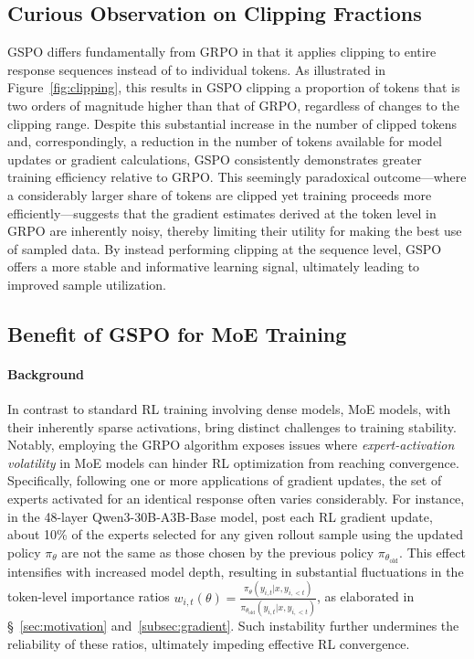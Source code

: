 \subsection{Curious Observation on Clipping Fractions}

GSPO differs fundamentally from GRPO in that it applies clipping to entire response sequences instead of to individual tokens. As illustrated in Figure~\ref{fig:clipping}, this results in GSPO clipping a proportion of tokens that is two orders of magnitude higher than that of GRPO, regardless of changes to the clipping range. Despite this substantial increase in the number of clipped tokens and, correspondingly, a reduction in the number of tokens available for model updates or gradient calculations, GSPO consistently demonstrates greater training efficiency relative to GRPO. This seemingly paradoxical outcome—where a considerably larger share of tokens are clipped yet training proceeds more efficiently—suggests that the gradient estimates derived at the token level in GRPO are inherently noisy, thereby limiting their utility for making the best use of sampled data. By instead performing clipping at the sequence level, GSPO offers a more stable and informative learning signal, ultimately leading to improved sample utilization.

\subsection{Benefit of GSPO for MoE Training}
\label{subsec:routing_replay}

\paragraph{Background}
In contrast to standard RL training involving dense models, MoE models, with their inherently sparse activations, bring distinct challenges to training stability. Notably, employing the GRPO algorithm exposes issues where \textit{expert-activation volatility} in MoE models can hinder RL optimization from reaching convergence. Specifically, following one or more applications of gradient updates, the set of experts activated for an identical response often varies considerably. For instance, in the 48-layer Qwen3-30B-A3B-Base model, post each RL gradient update, about 10\% of the experts selected for any given rollout sample using the updated policy $\pi_{\theta}$ are not the same as those chosen by the previous policy $\pi_{\theta_\text{old}}$. This effect intensifies with increased model depth, resulting in substantial fluctuations in the token-level importance ratios $w_{i,t}(\theta) = \frac{ \pi_{\theta} (y_{i,t} | x, y_{i,<t}) }{ \pi_{\theta_\text{old}} (y_{i,t} | x,y_{i,<t})}$, as elaborated in \S~\ref{sec:motivation} and~\ref{subsec:gradient}. Such instability further undermines the reliability of these ratios, ultimately impeding effective RL convergence.

